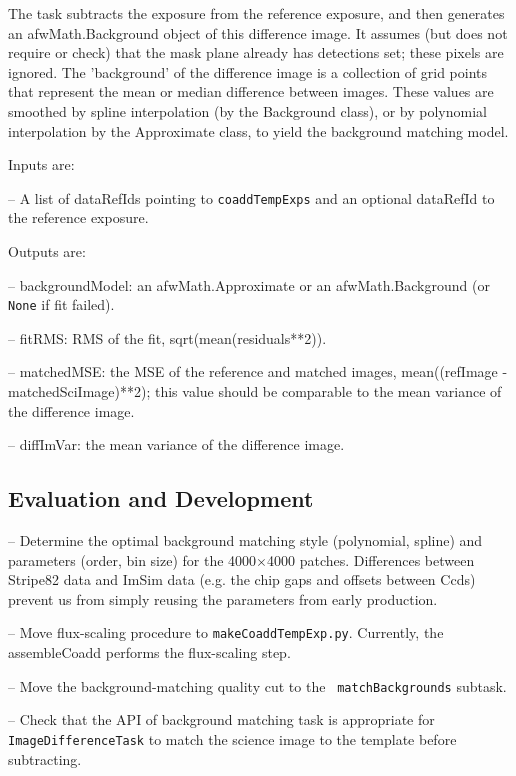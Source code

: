 \documentclass[prd, nofootinbib, floatfix, 11pt,tightenlines,times]{article}
\begin{document}
The task subtracts the exposure from the reference exposure, and then
generates an afwMath.Background object of this difference image. It
assumes (but does not require or check) that the mask plane already
has detections set; these pixels are ignored.  The 'background' of the
difference image is a collection of grid points that represent the
mean or median difference between images.  These values are smoothed
by spline interpolation (by the Background class), or by polynomial
interpolation by the Approximate class, to yield the background
matching model.

Inputs are: 

-- A list of dataRefIds pointing to {\tt coaddTempExps} and an
optional dataRefId to the reference exposure.

Outputs are:  

-- backgroundModel: an afwMath.Approximate or an afwMath.Background (or {\tt None} if fit failed).

-- fitRMS: RMS of the fit, sqrt(mean(residuals**2)).

-- matchedMSE: the MSE of the reference and matched images, mean((refImage - matchedSciImage)**2); 
   this value should be comparable to the mean variance of the difference image.

-- diffImVar: the mean variance of the difference image.

\subsection{Evaluation and Development}

-- Determine the optimal background matching style (polynomial,
spline) and parameters (order, bin size) for the 4000$\times$4000
patches. Differences between Stripe82 data and ImSim data (e.g. the
chip gaps and offsets between Ccds) prevent us from simply reusing the
parameters from early production.

-- Move flux-scaling procedure to {\tt makeCoaddTempExp.py}.
Currently, the assembleCoadd performs the flux-scaling step. 

-- Move the background-matching quality cut to the {\tt
  matchBackgrounds} subtask.

-- Check that the API of background matching task is appropriate for {\tt
  ImageDifferenceTask} to match the science image to the template
before subtracting.
\end{document}
